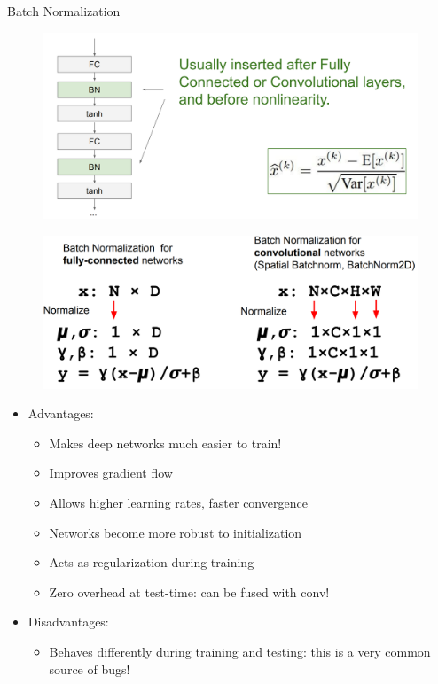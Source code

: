 \begin{frame}[allowframebreaks]{Batch Normalization}
\begin{figure}
    \end{figure}
\framebreak
    \begin{figure}
    \centering
    \includegraphics[width=1.0\textwidth,height=0.9\textheight,keepaspectratio]{images/cnn/batch_norm_4.png}
    \end{figure}
\framebreak
    \begin{figure}
    \centering
    \includegraphics[width=1.0\textwidth,height=0.9\textheight,keepaspectratio]{images/cnn/batch_norm_5.png}
    \end{figure}
\framebreak
    \begin{itemize}
        \item Advantages:
        \begin{itemize}
            \item Makes deep networks much easier to train!
            \item Improves gradient flow
            \item Allows higher learning rates, faster convergence
            \item Networks become more robust to initialization
            \item Acts as regularization during training
            \item Zero overhead at test-time: can be fused with conv!
        \end{itemize}
        \pause
        \item Disadvantages:
        \begin{itemize}
            \item Behaves differently during training and testing: this is a very common source of bugs!
        \end{itemize}
    \end{itemize}
\end{frame}

